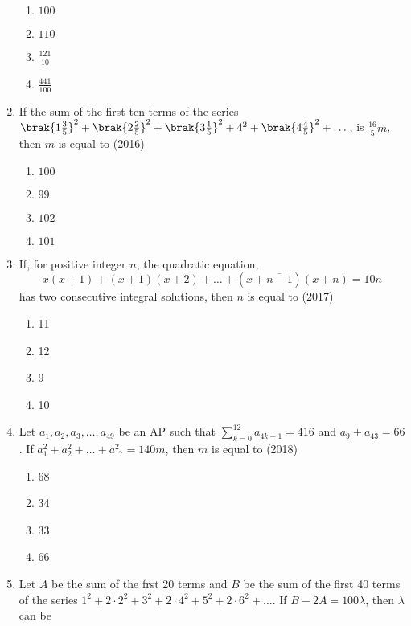 \begin{enumerate}[label=\thesubsection.\arabic*,ref=\thesubsection.\theenumi]
\begin{multicols}{4}
\begin{enumerate}    
    \item$100$
    \item$110$
    \item$\frac{121}{10}$
    \item$\frac{441}{100}$ 
    \end{enumerate}
\end{multicols}
%
    \item If the sum of the first ten terms of the series $\brak{1\frac{3}{5}}^2+\brak{2\frac{2}{5}}^2+\brak{3\frac{1}{5}}^2+4^2+\brak{4\frac{4}{5}}^2+\dots$,  is $\frac{16}{5}m$,  then $m$ is equal to 
%    
    \hfill(2016)
    \begin{multicols}{4}
\begin{enumerate}    
    \item$100$
    \item$99$
    \item$102$
    \item$101$
    \end{enumerate}
\end{multicols}
%
% 
	\item If,  for positive integer $n$,  the quadratic equation,  $$x(x+1)+(x+1)(x+2)+\dots+(x+\overline{n-1})(x+n)=10n$$  has two consecutive integral solutions,  then $n$ is equal to     \hfill{(2017)}  
\begin{multicols}{4}
\begin{enumerate}    
    \item {11}
    \item{12}
    \item {9} 
    \item{10}\end{enumerate}
    \end{multicols}
%
  \item Let $a_{1}, a_{2}, a_{3}, \dots, a_{49}$ be an AP such that $\sum_{k=0}^{12} a_{4k+1}=416$ and $a_{9}+a_{43}=66$. If $a_{1}^2+ a_{2}^{2}+\dots+a_{17}^{2}=140m$,  then $m$ is equal to \hfill{(2018)}\begin{multicols}{4}
\begin{enumerate}    
  \item {68}\item {34}\item{33}  \item{66}
  \end{enumerate}
\end{multicols}
  \item Let $A$ be the sum of the frst 20 terms and $B$ be the sum of the first 40 terms of the series $1^{2} +2\cdot2^{2}+3^{2}+2\cdot4^{2}+5^{2}+2\cdot6^{2}+\dots$. If $B-2A=100\lambda$,  then $\lambda$ can be 
	 

\end{enumerate}
